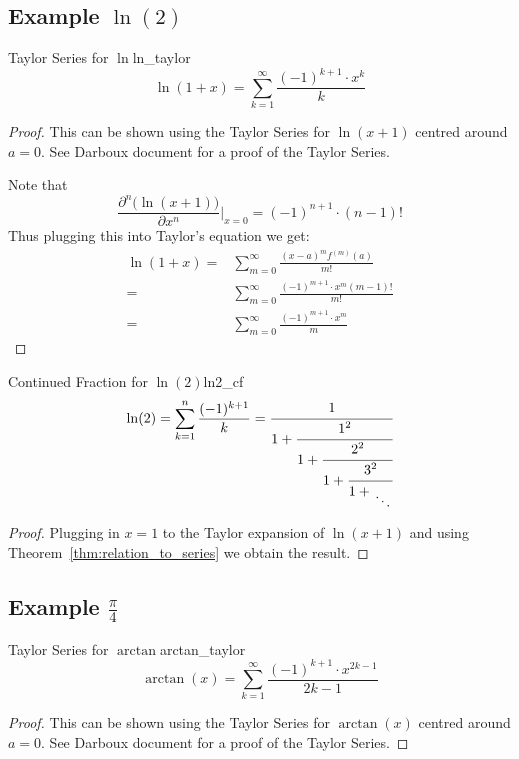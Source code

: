 \documentclass[a4paper]{article}
\begin{document}
\subsection{Example \texorpdfstring{$\ln(2)$}{ln(2)}}\label{cf:subsec:example-ln(2)}

\begin{mylemma}{Taylor Series for \texorpdfstring{$\ln$}{ln}}{ln_taylor}
  \[
    \ln(1+x) = \sum_{k=1}^{\infty} \frac{(-1)^{k+1} \cdot x^k}{k}
  \]

  \begin{proof}
    This can be shown using the Taylor Series for $\ln(x+1)$ centred around $a=0$.
    See Darboux document for a proof of the Taylor Series.

    Note that
    \begin{equation*}
      \frac{\partial^n \big(\ln(x+1) \big)}{\partial x^n} \rvert_{x=0} = (-1)^{n+1} \cdot (n-1)!
    \end{equation*}
    Thus plugging this into Taylor's equation we get:
    \begin{align*}
      \ln(1+x) = & \sum_{m=0}^{\infty} \frac{(x-a)^m f^{(m)}(a)}{m!}
      \\
      =          & \sum_{m=0}^{\infty} \frac{(-1)^{m+1} \cdot x^m (m-1)!}{m!}
      \\
      =          & \sum_{m=0}^{\infty} \frac{(-1)^{m+1} \cdot x^m}{m}
    \end{align*}
  \end{proof}
\end{mylemma}

\begin{mylemma}{Continued Fraction for \texorpdfstring{$\ln(2)$}{ln(2)}}{ln2_cf}
  \[
    \ln(2) = \sum_{k=1}^{n} \frac{(-1)^{k+1}}{k} = \cfrac{1}{1+\cfrac{1^{2}}{1 +\cfrac{2^2}{1 + \cfrac{3^2}{1 + \CFDots}}}}
  \]

  \begin{proof}
    Plugging in $x=1$ to the Taylor expansion of $\ln(x+1)$ and using Theorem~\ref{thm:relation_to_series} we obtain the result.
  \end{proof}
\end{mylemma}

\subsection{Example \texorpdfstring{$\frac{\pi}{4}$}{pi/4}}\label{cf:subsec:example-pi4}
\begin{mylemma}{Taylor Series for \texorpdfstring{$\arctan$}{arctan}}{arctan_taylor}
  \[
    \arctan(x) = \sum_{k=1}^{\infty} \frac{(-1)^{k+1} \cdot x^{2k-1}}{2k-1}
  \]

  \begin{proof}
    This can be shown using the Taylor Series for $\arctan(x)$ centred around $a=0$.
    See Darboux document for a proof of the Taylor Series.
  \end{proof}
\end{mylemma}
\end{document}
